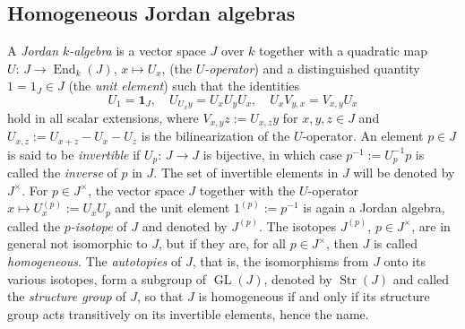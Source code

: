 \documentclass{amsart}
\theoremstyle{definition} %
\theoremstyle{remark} %
\DeclareMathOperator{\Str}{Str}
\newcommand{\Eins}{\mathrm{\mathbf{1}}}
\renewcommand{\:}{\colon\,}
\DeclareMathOperator{\End}{End}
\DeclareMathOperator{\GL}{GL}
\numberwithin{equation}{section}
\begin{document}
\subsection{Homogeneous Jordan algebras} \label{ss.HOJOAL} A \emph{Jordan $k$-algebra} is a vector space $J$ over $k$ together with a quadratic map $U\:J \to \End_k(J)$, $x \mapsto U_x$, (the \emph{$U$-operator}) and a distinguished quantity $1 = 1_J \in J$ (the \emph{unit element}) such that the identities
\[
U_1 = \Eins_J, \quad U_{U_xy} = U_xU_yU_x, \quad U_xV_{y,x} = V_{x,y}U_x
\]
hold in all scalar extensions, where $V_{x,y}z := U_{x,z}y$ for $x,y,z \in J$ and $U_{x,z} := U_{x+z} - U_x - U_z$ is the bilinearization of the $U$-operator. An element $p \in J$ is said to be \emph{invertible} if $U_p\:J \to J$ is bijective, in which case $p^{-1} := U_p^{-1}p$ is called the \emph{inverse} of $p$ in $J$. The set of invertible elements in $J$ will be denoted by $J^\times$. For $p \in J^\times$, the vector space $J$ together with the $U$-operator $x \mapsto U_x^{(p)} := U_xU_p$ and the unit element $1^{(p)} := p^{-1}$ is again a Jordan algebra, called the \emph{$p$-isotope} of $J$ and denoted by $J^{(p)}$. The isotopes $J^{(p)}$, $p \in J^\times$, are in general not isomorphic to $J$, but if they are, for all $p \in J^\times$, then $J$ is called \emph{homogeneous}. The \emph{autotopies} of $J$, that is, the isomorphisms from $J$ onto its various isotopes, form a subgroup of $\GL(J)$, denoted by $\Str(J)$ and called the \emph{structure group} of $J$, so that $J$ is homogeneous if and only if its structure group acts transitively on its invertible elements, hence the name.
\end{document}
